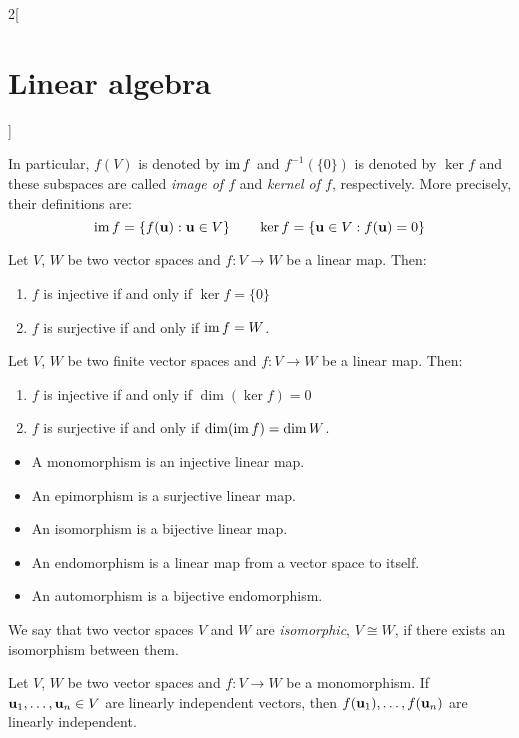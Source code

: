 \documentclass[../../../main.tex]{subfiles}
\begin{document}
\begin{multicols}{2}[\section{Linear algebra}]
\begin{prop}
\begin{enumerate}
    \end{enumerate}
    In particular, $f(V)$ is denoted by $\operatorname{im} f$ and $f^{-1}(\{0\})$ is denoted by $\ker f$ and these subspaces are called \textit{image of $f$} and \textit{kernel of $f$}, respectively. More precisely, their definitions are:
    $$\operatorname{im} f=\{f(\vb{u}): \vb{u}\in V\}\qquad\ker f=\{\vb{u}\in V: f(\vb{u})=0\}$$
  \end{prop}
  \begin{prop}
    Let $V$, $W$ be two vector spaces and $f:V\rightarrow W$ be a linear map. Then:
    \begin{enumerate}
      \item $f$ is injective if and only if $\ker f=\{0\}$
      \item $f$ is surjective if and only if $\operatorname{im} f=W$.
    \end{enumerate}
  \end{prop}
  \begin{corollary}
    Let $V$, $W$ be two finite vector spaces and $f:V\rightarrow W$ be a linear map. Then:
    \begin{enumerate}
      \item $f$ is injective if and only if $\dim(\ker f)=0$
      \item $f$ is surjective if and only if $\dim(\operatorname{im} f)=\dim W$.
    \end{enumerate}
  \end{corollary}
  \begin{definition}
    \hfill
    \begin{itemize}
      \item A monomorphism is an injective linear map.
      \item An epimorphism is a surjective linear map.
      \item An isomorphism is a bijective linear map.
      \item An endomorphism is a linear map from a vector space to itself.
      \item An automorphism is a bijective endomorphism.
    \end{itemize}
  \end{definition}
  \begin{definition}
    We say that two vector spaces $V$ and $W$ are \textit{isomorphic}, $V\cong W$, if there exists an isomorphism between them.
  \end{definition}
  \begin{prop}
    Let $V$, $W$ be two vector spaces and $f:V\rightarrow W$ be a monomorphism. If $\vb{u}_1,\ldots,\vb{u}_n\in V$ are linearly independent vectors, then $f(\vb{u}_1),\ldots,f(\vb{u}_n)$  are linearly independent.

\end{prop}
\end{multicols}
\end{document}
